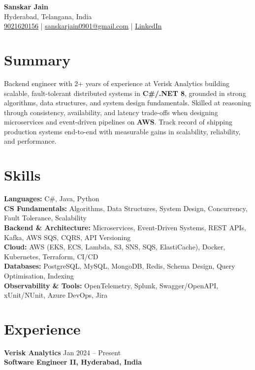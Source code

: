 \documentclass[a4paper,10pt]{article}
\begin{document}
\begin{center}
    {\LARGE \textbf{Sanskar Jain}} \\
    Hyderabad, Telangana, India \\
    \href{tel:9021620156}{9021620156} \;|\;
    \href{mailto:sanskarjain0901@gmail.com}{sanskarjain0901@gmail.com} \;|\;
    \href{https://www.linkedin.com/in/sanskar-jain0901/}{LinkedIn}
\end{center}

\vspace{3pt}

\section*{Summary}
Backend engineer with 2+ years of experience at Verisk Analytics building scalable, fault-tolerant distributed systems in \textbf{C\#/.NET 8}, grounded in strong algorithms, data structures, and system design fundamentals.
Skilled at reasoning through consistency, availability, and latency trade-offs when designing microservices and event-driven pipelines on \textbf{AWS}.
Track record of shipping production systems end-to-end with measurable gains in scalability, reliability, and performance.

\section*{Skills}
\textbf{Languages:} C\#, Java, Python \\
\textbf{CS Fundamentals:} Algorithms, Data Structures, System Design, Concurrency, Fault Tolerance, Scalability \\
\textbf{Backend \& Architecture:} Microservices, Event-Driven Systems, REST APIs, Kafka, AWS SQS, CQRS, API Versioning \\
\textbf{Cloud:} AWS (EKS, ECS, Lambda, S3, SNS, SQS, ElastiCache), Docker, Kubernetes, Terraform, CI/CD \\
\textbf{Databases:} PostgreSQL, MySQL, MongoDB, Redis, Schema Design, Query Optimisation, Indexing \\
\textbf{Observability \& Tools:} OpenTelemetry, Splunk, Swagger/OpenAPI, xUnit/NUnit, Azure DevOps, Jira

\section*{Experience}

\textbf{Verisk Analytics} \hfill Jan 2024 -- Present \\
\textbf{Software Engineer II, Hyderabad, India}
\end{document}
